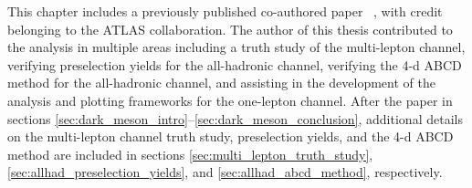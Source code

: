 This chapter includes a previously published co-authored paper ~\cite{2024_dark_mesons}, with credit belonging to the ATLAS collaboration.
The author of this thesis contributed to the analysis in multiple areas including a truth study of the multi-lepton channel, verifying preselection yields for the all-hadronic channel, verifying the 4-d ABCD method for the all-hadronic channel, and assisting in the development of the analysis and plotting frameworks for the one-lepton channel.
After the paper in sections \ref{sec:dark_meson_intro}--\ref{sec:dark_meson_conclusion}, additional details on the multi-lepton channel truth study, preselection yields, and the 4-d ABCD method are included in sections \ref{sec:multi_lepton_truth_study}, \ref{sec:allhad_preselection_yields}, and \ref{sec:allhad_abcd_method}, respectively.


